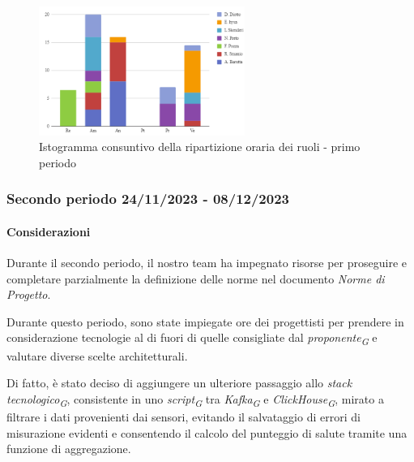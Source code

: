 \vspace{0.6cm}

\begin{figure}[H]
    \centering
    \includegraphics[width=0.6\textwidth]{../Images/consuntivoDivisioneRuoli1Periodo.png}
    \caption{Istogramma consuntivo della ripartizione oraria dei ruoli - primo periodo}
    \label{fig:Consuntivo_ripartizione_oraria_1}
\end{figure}


\subsubsection{Secondo periodo  24/11/2023 - 08/12/2023}
\paragraph{Considerazioni}

Durante il secondo periodo, il nostro team ha impegnato risorse per proseguire e completare parzialmente la definizione delle norme nel documento \textit{Norme di Progetto}.

Durante questo periodo, sono state impiegate ore dei progettisti per prendere in considerazione tecnologie al di fuori di quelle consigliate dal \textit{proponente}\textsubscript{\textit{G}} e valutare diverse scelte architetturali.

Di fatto, è stato deciso di aggiungere un ulteriore passaggio allo \textit{stack tecnologico}\textsubscript{\textit{G}}, consistente in uno \textit{script}\textsubscript{\textit{G}} tra \textit{Kafka}\textsubscript{\textit{G}} e \textit{ClickHouse}\textsubscript{\textit{G}}, mirato a filtrare i dati provenienti dai sensori, evitando il salvataggio di errori di misurazione evidenti e consentendo il calcolo del punteggio di salute tramite una funzione di aggregazione.

\vspace{0.2cm}

